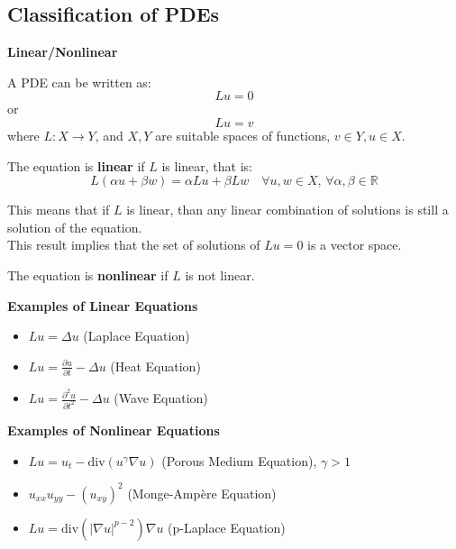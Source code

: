 
\subsection{Classification of PDEs}

\textbf{Linear/Nonlinear}

A PDE can be written as:
\[
L u = 0
\]
or
\[
L u = v
\]
where \( L: X \to Y \), and \( X, Y \) are suitable spaces of functions, $v \in Y, u \in X$.

\begin{DefBox}
    \begin{Def}
        The equation is \textbf{linear} if \( L \) is linear, that is:
\[
L(\alpha u + \beta w) = \alpha L u + \beta L w \quad \forall u, w \in X, \, \forall \alpha, \beta \in \mathbb{R}
\]
    \end{Def}
\end{DefBox}
This means that if $L$ is linear, than any linear combination of solutions is still a solution of the equation. \\
This result implies that the set of solutions of \( L u = 0 \) is a vector space.

\begin{DefBox}
    \begin{Def}
        The equation is \textbf{nonlinear} if \( L \) is not linear.
    \end{Def}
\end{DefBox}

\textbf{Examples of Linear Equations}
\begin{itemize}
    \item \( L u = \Delta u \) (Laplace Equation)
    \item \( L u = \frac{\partial u}{\partial t} - \Delta u \) (Heat Equation)
    \item \( L u = \frac{\partial^2 u}{\partial t^2} - \Delta u \) (Wave Equation)
\end{itemize}

\textbf{Examples of Nonlinear Equations}
\begin{itemize}
    \item \( L u = u_t - \text{div}(u^\gamma \nabla u) \) \hfill (Porous Medium Equation), \quad \(\gamma > 1 \)
    \item \( u_{xx} u_{yy} - (u_{xy})^2\) \hfill (Monge-Ampère Equation)
    \item \( L u = \text{div}(|\nabla u|^{p-2})\nabla u\) \hfill (p-Laplace Equation)
\end{itemize}

